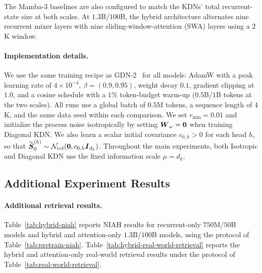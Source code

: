 \documentclass{article} %
\begin{document}
The Mamba-3 baselines are also
configured to match the KDNs' total recurrent-state size at both scales. At $1.3$B/$100$B, the
hybrid architecture alternates nine recurrent mixer layers with nine sliding-window-attention
(SWA) layers using a $2$K window.

\paragraph{Implementation details.}
We use the same training recipe as GDN-2~\citep{hatamizadeh2026gdn2} for all models: AdamW with a
peak learning rate of $4\times10^{-4}$, $\beta=(0.9,0.95)$, weight decay $0.1$, gradient clipping
at $1.0$, and a cosine schedule with a $1\%$ token-budget warm-up ($0.5$B/$1$B tokens at
the two scales). All runs use a global
batch of $0.5$M tokens, a sequence length of $4$K, and the same data seed within each comparison.
We set $r_{\min}=0.01$ and initialize the process noise isotropically by setting
$\boldsymbol{W}_{\omega}=\boldsymbol{0}$ when training Diagonal KDN. We also learn a scalar initial covariance
$c_{0,h}>0$ for each head $h$, so that
$\widetilde{\boldsymbol{S}}_0^{(h)}\sim\mathcal N_{\mathrm{col}}(\boldsymbol{0},c_{0,h}\boldsymbol{I}_{d_k})$.
Throughout the main experiments, both Isotropic and Diagonal KDN use the fixed information scale
$\mu=d_k$.

\subsection{Additional Experiment Results}
\label{app:additional-experiment-results}

\paragraph{Additional retrieval results.}
Table~\ref{tab:hybrid-niah} reports NIAH results for recurrent-only $750$M/$50$B models
and hybrid and attention-only $1.3$B/$100$B models, using the protocol of Table~\ref{tab:pretrain-niah}.
Table~\ref{tab:hybrid-real-world-retrieval} reports the hybrid and attention-only real-world
retrieval results under the protocol of Table~\ref{tab:real-world-retrieval}.
\end{document}
